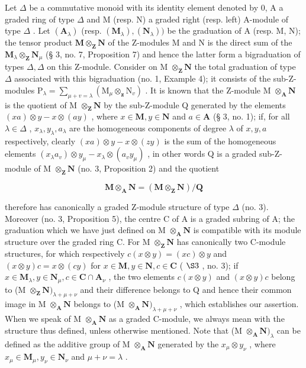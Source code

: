 Let \(\Delta\) be a commutative monoid with its identity element denoted by 0, A a graded ring of type \(\Delta\) and M (resp. N) a graded right (resp. left) A-module of type \(\Delta\) . Let \((\mathbf{A}_{\lambda})\) (resp. \((\mathbf{M}_{\lambda}), (\mathbf{N}_{\lambda}))\) be the graduation of A (resp. M, N); the tensor product \(\mathbf{M} \otimes_{\mathbf{Z}} \mathbf{N}\) of the Z-modules M and N is the direct sum of the \(\mathbf{M}_{\lambda} \otimes_{\mathbf{Z}} \mathbf{N}_{\mu}\) (§ 3, no. 7, Proposition 7) and hence the latter form a bigraduation of types \(\Delta, \Delta\) on this Z-module. Consider on M \(\otimes_{\mathbf{Z}} \mathbf{N}\) the total graduation of type \(\Delta\) associated with this bigraduation (no. 1, Example 4); it consists of the sub-Z-modules \(\mathrm{P}_{\lambda} = \sum_{\mu + v = \lambda} (\mathrm{M}_{\mu} \otimes_{\mathbf{z}} \mathrm{N}_{v})\) . It is known that the Z-module M \(\otimes_{\mathbf{A}} \mathbf{N}\) is the quotient of M \(\otimes_{\mathbf{Z}} \mathbf{N}\) by the sub-Z-module Q generated by the elements \((xa) \otimes y - x \otimes (ay)\) , where \(x \in \mathbf{M}, y \in \mathbf{N}\) and \(a \in \mathbf{A}\) (§ 3, no. 1); if, for all \(\lambda \in \Delta\) , \(x_{\lambda}, y_{\lambda}, a_{\lambda}\) are the homogeneous components of degree \(\lambda\) of \(x, y, a\) respectively, clearly \((xa) \otimes y - x \otimes (zy)\) is the sum of the homogeneous elements \((x_{\lambda}a_{v}) \otimes y_{\mu} - x_{\lambda} \otimes (a_{v}y_{\mu})\) , in other words Q is a graded sub-Z-module of M \(\otimes_{\mathbf{Z}} \mathbf{N}\) (no. 3, Proposition 2) and the quotient

\[
\mathbf {M} \otimes_ {\mathbf {A}} \mathbf {N} = (\mathbf {M} \otimes_ {\mathbf {Z}} \mathbf {N}) / \mathbf {Q}
\]

therefore has canonically a graded Z-module structure of type \(\Delta\) (no. 3). Moreover (no. 3, Proposition 5), the centre C of A is a graded subring of A; the graduation which we have just defined on M \(\otimes_{\mathbf{A}} \mathbf{N}\) is compatible with its module structure over the graded ring C. For M \(\otimes_{\mathbf{Z}} \mathbf{N}\) has canonically two C-module structures, for which respectively \(c(x \otimes y) = (xc) \otimes y\) and \((x \otimes y)c = x \otimes (cy)\) for \(x \in \mathbf{M}, y \in \mathbf{N}, c \in \mathbf{C}\) ( \(\S 3\) , no. 3); if \(x \in \mathbf{M}_{\lambda}, y \in \mathbf{N}_{\mu}, c \in \mathbf{C} \cap \mathbf{A}_{\nu}\) , the two elements \(c(x \otimes y)\) and \((x \otimes y)c\) belong to (M \(\otimes_{\mathbf{Z}} \mathbf{N})_{\lambda + \mu + \nu}\) and their difference belongs to Q and hence their common image in M \(\otimes_{\mathbf{A}} \mathbf{N}\) belongs to (M \(\otimes_{\mathbf{A}} \mathbf{N})_{\lambda + \mu + \nu}\) , which establishes our assertion. When we speak of M \(\otimes_{\mathbf{A}} \mathbf{N}\) as a graded C-module, we always mean with the structure thus defined, unless otherwise mentioned. Note that (M \(\otimes_{\mathbf{A}} \mathbf{N})_{\lambda}\) can be defined as the additive group of M \(\otimes_{\mathbf{A}} \mathbf{N}\) generated by the \(x_{\mu} \otimes y_{\nu}\) , where \(x_{\mu} \in \mathbf{M}_{\mu}, y_{\nu} \in \mathbf{N}_{\nu}\) and \(\mu + \nu = \lambda\) .

